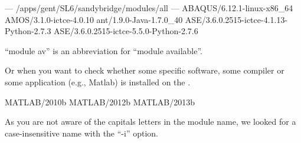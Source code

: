 \begin{prompt}
--- /apps/gent/SL6/sandybridge/modules/all ---
ABAQUS/6.12.1-linux-x86_64
AMOS/3.1.0-ictce-4.0.10
ant/1.9.0-Java-1.7.0_40
ASE/3.6.0.2515-ictce-4.1.13-Python-2.7.3
ASE/3.6.0.2515-ictce-5.5.0-Python-2.7.6
\end{prompt}

``module av'' is an abbreviation for ``module available''.

Or when you want to check whether some specific software, some compiler or some
application (e.g., Matlab) is installed on the \hpc.

\begin{prompt}
MATLAB/2010b
MATLAB/2012b
MATLAB/2013b
\end{prompt}

As you are not aware of the capitals letters in the module name, we looked for
a case-insensitive name with the ``-i'' option.
